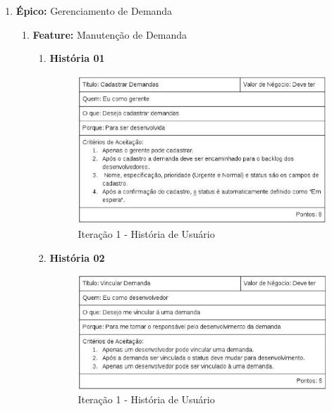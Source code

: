 \begin{enumerate}
	\item \textbf{Épico:} Gerenciamento de Demanda
		\begin{enumerate}
			\item \textbf{Feature:} Manutenção de Demanda
				\begin{enumerate}
					\item \textbf{História 01}
						\begin{figure}[H]
						    \centering
							\includegraphics[keepaspectratio=true,scale=0.8]{figuras/iteracao_1/historia_1.eps}
						    \caption{Iteração 1 - História de Usuário}
						    \label{fig:historia1}
						\end{figure}
						
					\item \textbf{História 02}
						\begin{figure}[H]
						    \centering
							\includegraphics[keepaspectratio=true,scale=0.8]{figuras/iteracao_1/historia_2.eps}
						    \caption{Iteração 1 - História de Usuário}
						    \label{fig:historia1}
						\end{figure}


\end{enumerate}
\end{enumerate}
\end{enumerate}
